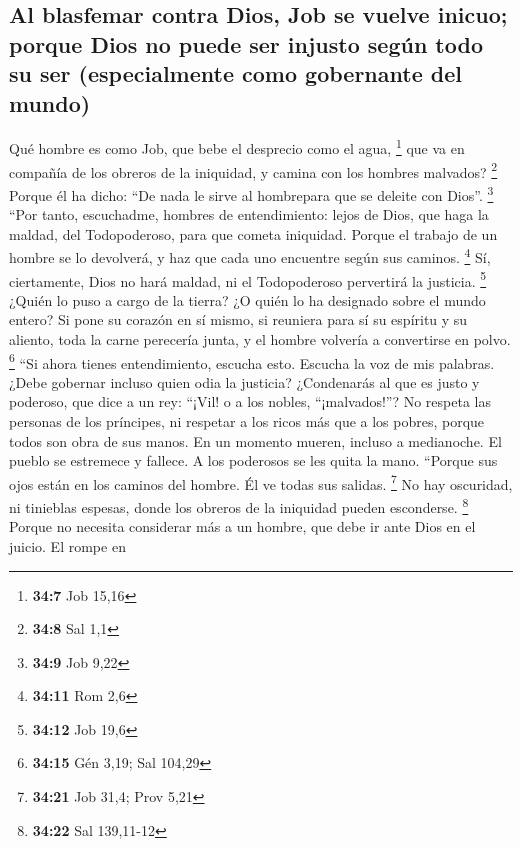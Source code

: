 \begin{paracol}{2}
{\subsection{Al blasfemar contra Dios, Job se vuelve inicuo; porque Dios
no puede ser injusto según todo su ser (especialmente como gobernante
del
mundo)}\label{al-blasfemar-contra-dios-job-se-vuelve-inicuo-porque-dios-no-puede-ser-injusto-seguxfan-todo-su-ser-especialmente-como-gobernante-del-mundo}}

 Qué hombre es como Job, que bebe el desprecio como el
agua, \footnote{\textbf{34:7} Job 15,16}  que va en
compañía de los obreros de la iniquidad, y camina con los hombres
malvados? \footnote{\textbf{34:8} Sal 1,1}  Porque él ha
dicho: ``De nada le sirve al hombrepara que se deleite con Dios''.
\footnote{\textbf{34:9} Job 9,22}  ``Por tanto,
escuchadme, hombres de entendimiento: lejos de Dios, que haga la maldad,
del Todopoderoso, para que cometa iniquidad.  Porque el
trabajo de un hombre se lo devolverá, y haz que cada uno encuentre según
sus caminos. \footnote{\textbf{34:11} Rom 2,6}  Sí,
ciertamente, Dios no hará maldad, ni el Todopoderoso pervertirá la
justicia. \footnote{\textbf{34:12} Job 19,6}  ¿Quién lo
puso a cargo de la tierra? ¿O quién lo ha designado sobre el mundo
entero?  Si pone su corazón en sí mismo, si reuniera para
sí su espíritu y su aliento,  toda la carne perecería
junta, y el hombre volvería a convertirse en polvo. \footnote{\textbf{34:15}
  Gén 3,19; Sal 104,29}  ``Si ahora tienes entendimiento,
escucha esto. Escucha la voz de mis palabras.  ¿Debe
gobernar incluso quien odia la justicia? ¿Condenarás al que es justo y
poderoso,  que dice a un rey: ``¡Vil! o a los nobles,
``¡malvados!''?  No respeta las personas de los
príncipes, ni respetar a los ricos más que a los pobres, porque todos
son obra de sus manos.  En un momento mueren, incluso a
medianoche. El pueblo se estremece y fallece. A los poderosos se les
quita la mano.  ``Porque sus ojos están en los caminos
del hombre. Él ve todas sus salidas. \footnote{\textbf{34:21} Job 31,4;
  Prov 5,21}  No hay oscuridad, ni tinieblas espesas,
donde los obreros de la iniquidad pueden esconderse. \footnote{\textbf{34:22}
  Sal 139,11-12}  Porque no necesita considerar más a un
hombre, que debe ir ante Dios en el juicio.  El rompe en

\end{paracol}
